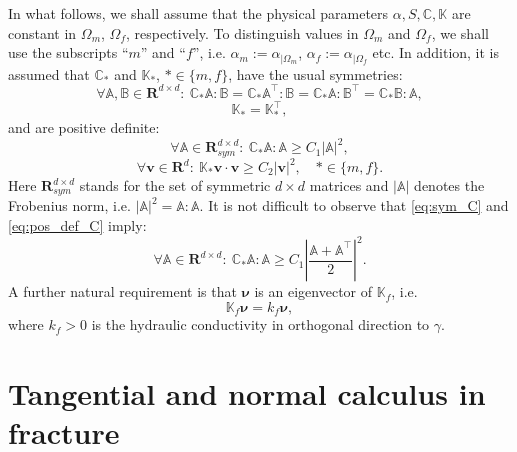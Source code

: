 \documentclass[a4paper]{article}
\def\nnu{\vc\nu}
\def\Real{{\mathbf R}}
\def\tn#1{{\mathbb{#1}}}    %
\def\vc#1{\mathbf{\boldsymbol{#1}}}     %
\def\vv{\vc v}
\newcommand{\eq}[1]{\begin{equation}#1\end{equation}}
\begin{document}
In what follows, we shall assume that the physical parameters $\alpha,S,\tn C,\tn K$ are constant in $\Omega_m$, $\Omega_f$, respectively.
To distinguish values in $\Omega_m$ and $\Omega_f$, we shall use the subscripts ``$m$'' and ``$f$'', i.e. $\alpha_m := \alpha_{|\Omega_m}$, $\alpha_f := \alpha_{|\Omega_f}$ etc.
In addition, it is assumed that $\tn C_*$ and $\tn K_*$, $*\in\{m,f\}$, have the usual symmetries:
\eq{ \label{eq:sym_C} \forall \tn A,\tn B\in\Real^{d\times d}:~ \tn C_*\tn A:\tn B=\tn C_*\tn A^\top:\tn B=\tn C_*\tn A:\tn B^\top=\tn C_*\tn B:\tn A, }
\eq{ \tn K_* = \tn K_*^\top, }
and are positive definite:
\eq{ \label{eq:pos_def_C} \forall\tn A\in\Real^{d\times d}_{sym}:~\tn C_*\tn A:\tn A \ge C_1|\tn A|^2, }
\eq{ \forall\vv\in\Real^d:~\tn K_*\vv\cdot\vv \ge C_2|\vv|^2,\quad *\in\{m,f\}. }
Here $\Real^{d\times d}_{sym}$ stands for the set of symmetric $d\times d$ matrices and $|\tn A|$ denotes the Frobenius norm, i.e. $|\tn A|^2=\tn A:\tn A$.
It is not difficult to observe that \eqref{eq:sym_C} and \eqref{eq:pos_def_C} imply:
\eq{ \label{eq:pos_def_C_gen} \forall\tn A\in\Real^{d\times d}:~\tn C_*\tn A:\tn A \ge C_1\left|\frac{\tn A+\tn A^\top}2\right|^2. }
A further natural requirement is that $\nnu$ is an eigenvector of $\tn K_f$, i.e.
\eq{\label{eq:normal_conductivity} \tn K_f\nnu = k_f\nnu, }
where $k_f>0$ is the hydraulic conductivity in orthogonal direction to $\gamma$.




\section{Tangential and normal calculus in fracture}\label{sec:calculus}
\end{document}

